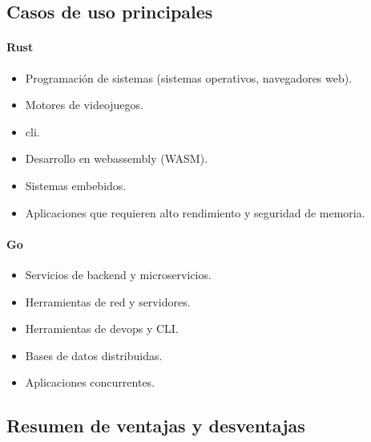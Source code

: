 \subsection{Casos de uso principales}
\paragraph{Rust}

\begin{itemize}
    \item Programación de sistemas (sistemas operativos, navegadores web).
    \item Motores de videojuegos.
    \item \acrfull{cli}.
    \item Desarrollo en \gls{webassembly} (WASM).
    \item Sistemas embebidos.
    \item Aplicaciones que requieren alto rendimiento y seguridad de memoria.
\end{itemize}

\paragraph{Go}

\begin{itemize}
    \item Servicios de backend y microservicios.
    \item Herramientas de red y servidores.
    \item Herramientas de \gls{devops} y CLI.
    \item Bases de datos distribuidas.
    \item Aplicaciones concurrentes.
\end{itemize}

\subsection{Resumen de ventajas y desventajas}

